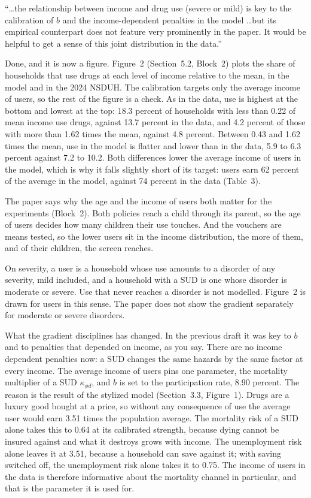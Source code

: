 \documentclass[11pt]{article}
\begin{document}
\begin{referee}
``\dots the relationship between income and drug use (severe or mild) is key to
the calibration of $b$ and the income-dependent penalties in the model \dots but
its empirical counterpart does not feature very prominently in the paper. It would
be helpful to get a sense of this joint distribution in the data.''
\end{referee}
\begin{response}
Done, and it is now a figure. Figure~2 (Section~5.2, Block~2) plots the share of
households that use drugs at each level of income relative to the mean, in the model
and in the 2024 NSDUH. The calibration targets only the average income of users, so
the rest of the figure is a check. As in the data, use is highest at the bottom and
lowest at the top: 18.3 percent of households with less than 0.22 of mean income use
drugs, against 13.7 percent in the data, and 4.2 percent of those with more than 1.62
times the mean, against 4.8 percent. Between 0.43 and 1.62 times the mean, use in the
model is flatter and lower than in the data, 5.9 to 6.3 percent against 7.2 to 10.2.
Both differences lower the average income of users in the model, which is why it falls
slightly short of its target: users earn 62 percent of the average in the model,
against 74 percent in the data (Table~3).

The paper says why the age and the income of users both matter for the experiments
(Block~2). Both policies reach a child through its parent, so the age of users decides
how many children their use touches. And the vouchers are means tested, so the lower
users sit in the income distribution, the more of them, and of their children, the
screen reaches.

On severity, a user is a household whose use amounts to a disorder of any severity,
mild included, and a household with a SUD is one whose disorder is moderate or severe.
Use that never reaches a disorder is not modelled. Figure~2 is drawn for users in this
sense. \open The paper does not show the gradient separately for moderate or severe
disorders.

What the gradient disciplines has changed. In the previous draft it was key to $b$
and to penalties that depended on income, as you say. There are no income dependent
penalties now: a SUD changes the same hazards by the same factor at every income. The
average income of users pins one parameter, the mortality multiplier of a SUD
$\kappa_{\phi d}$, and $b$ is set to the participation rate, 8.90 percent. The reason
is the result of the stylized model (Section~3.3, Figure~1). Drugs are a luxury good bought at a price, so
without any consequence of use the average user would earn 3.51 times the population
average. The mortality risk of a SUD alone takes this to 0.64 at its calibrated
strength, because dying cannot be insured against and what it destroys grows with
income. The unemployment risk alone leaves it at 3.51, because a household can save
against it; with saving switched off, the unemployment risk alone takes it to 0.75.
The income of users in the data is therefore informative about the mortality channel
in particular, and that is the parameter it is used for.


\end{response}
\end{document}
